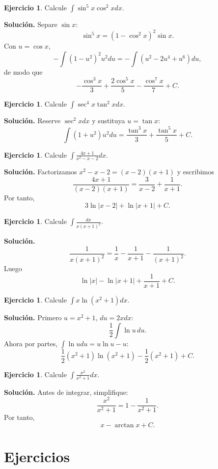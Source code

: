 \documentclass[12pt]{article}
\theoremstyle{definition}
\newtheorem{ejercicio}[teorema]{Ejercicio}
\theoremstyle{remark}
\begin{document}
\begin{ejercicio}Calcule $\int\sin^5x\cos^2xdx$.\end{ejercicio}
\textbf{Solución.} Separe $\sin x$:
\[\sin^5x=(1-\cos^2x)^2\sin x.\]
Con $u=\cos x$,
\[-\int(1-u^2)^2u^2du=-\int(u^2-2u^4+u^6)du,\]
de modo que
\[\boxed{-\frac{\cos^3x}{3}+\frac{2\cos^5x}{5}-\frac{\cos^7x}{7}+C}.\]

\begin{ejercicio}Calcule $\int\sec^4x\tan^2xdx$.\end{ejercicio}
\textbf{Solución.} Reserve $\sec^2x dx$ y sustituya $u=\tan x$:
\[\int(1+u^2)u^2du=\boxed{\frac{\tan^3x}{3}+\frac{\tan^5x}{5}+C}.\]

\begin{ejercicio}Calcule $\int\frac{4x+1}{x^2-x-2}dx$.\end{ejercicio}
\textbf{Solución.} Factorizamos $x^2-x-2=(x-2)(x+1)$ y escribimos
\[\frac{4x+1}{(x-2)(x+1)}=\frac{3}{x-2}+\frac1{x+1}.\]
Por tanto,
\[\boxed{3\ln|x-2|+\ln|x+1|+C}.\]

\begin{ejercicio}Calcule $\int\frac{dx}{x(x+1)^2}$.\end{ejercicio}
\textbf{Solución.}
\[\frac1{x(x+1)^2}=\frac1x-\frac1{x+1}-\frac1{(x+1)^2}.\]
Luego
\[\boxed{\ln|x|-\ln|x+1|+\frac1{x+1}+C}.\]


\begin{ejercicio}Calcule $\int x\ln(x^2+1)dx$.\end{ejercicio}
\textbf{Solución.} Primero $u=x^2+1$, $du=2xdx$:
\[\frac12\int\ln u\,du.\]
Ahora por partes, $\int\ln udu=u\ln u-u$:
\[\boxed{\frac12(x^2+1)\ln(x^2+1)-\frac12(x^2+1)+C}.\]

\begin{ejercicio}Calcule $\int\frac{x^2}{x^2+1}dx$.\end{ejercicio}
\textbf{Solución.} Antes de integrar, simplifique:
\[\frac{x^2}{x^2+1}=1-\frac1{x^2+1}.\]
Por tanto,
\[\boxed{x-\arctan x+C}.\]
\newpage
\section{Ejercicios}
\end{document}
